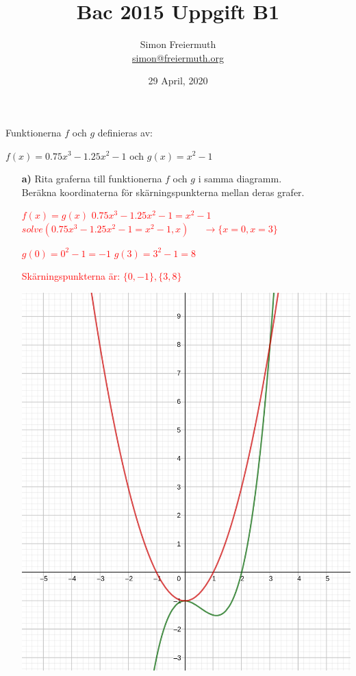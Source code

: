 \documentclass[12pt, letterpaper, twoside]{article}
\title{Bac 2015 Uppgift B1}
\author{Simon Freiermuth \\ \href{mailto:simon@freiermuth.org}{simon@freiermuth.org}}
\date{29 April, 2020}
\begin{document}
\maketitle

\begin{flushleft}
Funktionerna $ f $ och $ g $ definieras av:

\hfill

$ f(x)=0.75x^3 - 1.25x^2 -1 $ och $ g(x) = x^2 - 1 $

\begin{itemize}
	\item[\textbf{a)}]
	Rita graferna till funktionerna $ f $ och $ g $ i samma diagramm. \\
	Beräkna koordinaterna för skärningspunkterna mellan deras grafer.

	\textcolor{red}{
	    $ f(x)=g(x) $
	    $ 0.75x^3 - 1.25x^2 -1 = x^2 - 1 $
	    $ solve(0.75x^3 - 1.25x^2 -1 = x^2 - 1, x) $
	    $ \ \ \ \ \ \rightarrow \{x=0,x=3\} $
	}


	\textcolor{red}{
	    $ g(0) = 0^2-1 = -1 $
	    $ g(3) = 3^2-1 = 8 $
	}


    \textcolor{red}{
        Skärningspunkterna är:
        $ \{0,-1\}, \{3,8\} $
    }

	\includegraphics[scale=0.5]{graf1}


\end{itemize}
\end{flushleft}
\end{document}
